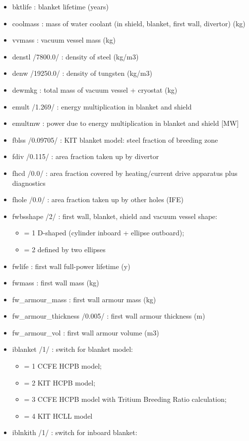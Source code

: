 \documentclass[]{article}
\providecommand{\tightlist}{%
  \setlength{\itemsep}{0pt}\setlength{\parskip}{0pt}}
\begin{document}
\begin{itemize}
\item
  bktlife : blanket lifetime (years)
\item
  coolmass : mass of water coolant (in shield, blanket, first wall,
  divertor) (kg)
\item
  vvmass : vacuum vessel mass (kg)
\item
  denstl /7800.0/ : density of steel (kg/m3)
\item
  denw /19250.0/ : density of tungsten (kg/m3)
\item
  dewmkg : total mass of vacuum vessel + cryostat (kg)
\item
  emult /1.269/ : energy multiplication in blanket and shield
\item
  emultmw : power due to energy multiplication in blanket and shield
  {[}MW{]}
\item
  fblss /0.09705/ : KIT blanket model: steel fraction of breeding zone
\item
  fdiv /0.115/ : area fraction taken up by divertor
\item
  fhcd /0.0/ : area fraction covered by heating/current drive apparatus
  plus diagnostics
\item
  fhole /0.0/ : area fraction taken up by other holes (IFE)
\item
  fwbsshape /2/ : first wall, blanket, shield and vacuum vessel shape:

  \begin{itemize}
  \tightlist
  \item
    = 1 D-shaped (cylinder inboard + ellipse outboard);
  \item
    = 2 defined by two ellipses
  \end{itemize}
\item
  fwlife : first wall full-power lifetime (y)
\item
  fwmass : first wall mass (kg)
\item
  fw\_armour\_mass : first wall armour mass (kg)
\item
  fw\_armour\_thickness /0.005/ : first wall armour thickness (m)
\item
  fw\_armour\_vol : first wall armour volume (m3)
\item
  iblanket /1/ : switch for blanket model:

  \begin{itemize}
  \tightlist
  \item
    = 1 CCFE HCPB model;
  \item
    = 2 KIT HCPB model;
  \item
    = 3 CCFE HCPB model with Tritium Breeding Ratio calculation;
  \item
    = 4 KIT HCLL model
  \end{itemize}
\item
  iblnkith /1/ : switch for inboard blanket:


\end{itemize}
\end{document}
